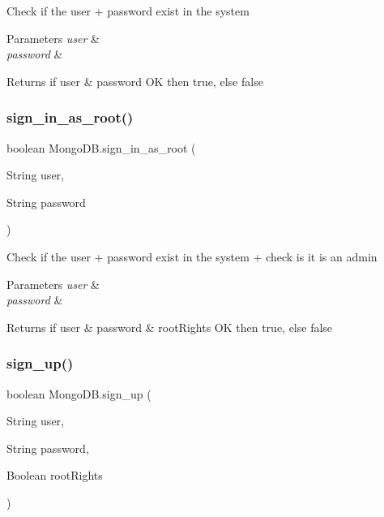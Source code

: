 Check if the user + password exist in the system 
\begin{DoxyParams}{Parameters}
{\em user} & \\
\hline
{\em password} & \\
\hline
\end{DoxyParams}
\begin{DoxyReturn}{Returns}
if user \& password OK then true, else false 
\end{DoxyReturn}
\mbox{\label{class_mongo_d_b_afa13d12f56548fcf6c5ca12ec66bc73c}} 
\subsubsection{\texorpdfstring{sign\+\_\+in\+\_\+as\+\_\+root()}{sign\_in\_as\_root()}}
{\footnotesize\ttfamily boolean Mongo\+D\+B.\+sign\+\_\+in\+\_\+as\+\_\+root (\begin{DoxyParamCaption}\item[{String}]{user,  }\item[{String}]{password }\end{DoxyParamCaption})}

Check if the user + password exist in the system + check is it is an admin 
\begin{DoxyParams}{Parameters}
{\em user} & \\
\hline
{\em password} & \\
\hline
\end{DoxyParams}
\begin{DoxyReturn}{Returns}
if user \& password \& root\+Rights OK then true, else false 
\end{DoxyReturn}
\mbox{\label{class_mongo_d_b_a9c69be7c091bffc9d1950e118fdb2251}} 
\subsubsection{\texorpdfstring{sign\+\_\+up()}{sign\_up()}}
{\footnotesize\ttfamily boolean Mongo\+D\+B.\+sign\+\_\+up (\begin{DoxyParamCaption}\item[{String}]{user,  }\item[{String}]{password,  }\item[{Boolean}]{root\+Rights }\end{DoxyParamCaption})}


